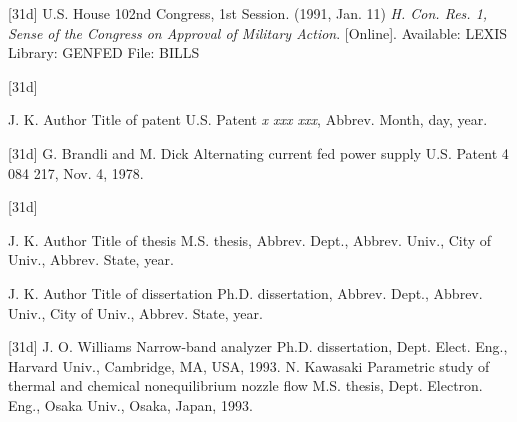 \documentclass[letter]{IEEEtaes}
\begin{document}
\vspace*{-12pt}
\begin{thebibliography}{[31d]}
\setcounter{enumiv}{16}
U.S. House
\newblock 102nd Congress, 1st Session. (1991, Jan. 11)
\newblock\emph{H. Con. Res. 1, Sense of the Congress on Approval of Military Action}. {[}Online{]}. Available: LEXIS Library: GENFED File: BILLS
\end{thebibliography}

\vspace*{-12pt}
\begin{thebibliography}{[31d]}
\item[] J. K. Author
\newblock Title of patent
\newblock U.S. Patent \emph{x xxx xxx}, Abbrev. Month, day, year.
\end{thebibliography}

\vspace*{-12pt}
\begin{thebibliography}{[31d]}
\setcounter{enumiv}{17}
   G. Brandli and M. Dick
\newblock Alternating current fed power supply
\newblock U.S. Patent 4 084 217, Nov. 4, 1978.
\end{thebibliography}

\vspace*{-12pt}
\begin{thebibliography}{[31d]}
\item[] J. K. Author
\newblock Title of thesis
\newblock M.S. thesis, Abbrev. Dept., Abbrev. Univ., City of Univ., Abbrev. State, year.\vfill\pagebreak
\item[] J. K. Author
\newblock Title of dissertation
\newblock Ph.D. dissertation, Abbrev. Dept., Abbrev. Univ., City of Univ., Abbrev. State, year.
\end{thebibliography}

\vspace*{-12pt}
\begin{thebibliography}{[31d]}
\setcounter{enumiv}{18}
J. O. Williams
\newblock Narrow-band analyzer
\newblock Ph.D. dissertation, Dept. Elect. Eng., Harvard Univ., Cambridge, MA, USA, 1993.
N. Kawasaki
\newblock Parametric study of thermal and chemical nonequilibrium nozzle flow
\newblock M.S. thesis, Dept. Electron. Eng., Osaka Univ., Osaka, Japan, 1993.
\end{thebibliography}
\end{document}
